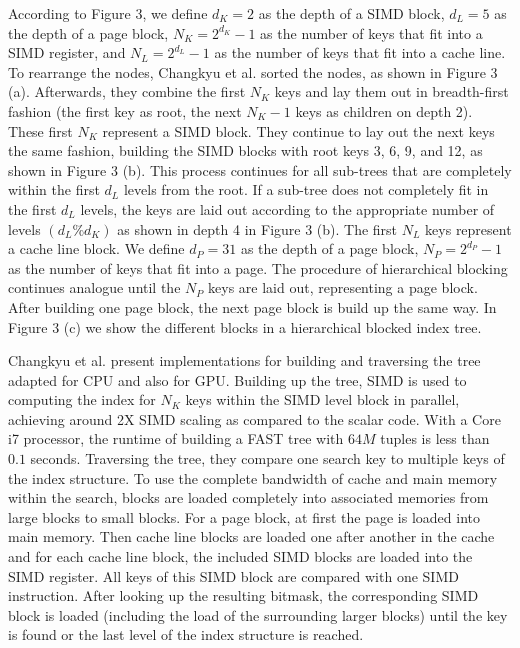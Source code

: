 \documentclass[conference]{IEEEtran}
\begin{document}
According to Figure 3, we define $d_K=2$ as the depth of a SIMD block, $d_L=5$ as the depth of a page block, $N_K=2^{d_K} -1$ as the number of keys that fit into a SIMD register, and $N_L = 2^{d_L} - 1$ as the number of keys that fit into a cache line. To rearrange the nodes, Changkyu et al. sorted the nodes, as shown in Figure 3 (a). Afterwards, they combine the first $N_K$ keys and lay them out in breadth-first fashion (the first key as root, the next $N_K - 1$ keys as children on depth 2). These first $N_K$ represent a SIMD block. They continue to lay out the next keys the same fashion, building the SIMD blocks with root keys 3, 6, 9, and 12, as shown in Figure 3 (b). This process continues for all sub-trees that are completely within the first $d_L$ levels from the root. If a sub-tree does not completely fit in the first $d_L$ levels, the keys are laid out according to the appropriate number of levels $(d_L \% d_K)$ as shown in depth 4 in Figure 3 (b). The first $N_L$ keys represent a cache line block. We define $d_P=31$ as the depth of a page block, $N_P=2^{d_P} -1$ as the number of keys that fit into a page. The procedure of hierarchical blocking continues analogue until the $N_P$ keys are laid out, representing a page block. After building one page block, the next page block is build up the same way. In Figure 3 (c) we show the different blocks in a hierarchical blocked index tree.

Changkyu et al. present implementations for building and traversing the tree adapted for CPU and also for GPU. Building up the tree, SIMD is used to computing the index for $N_K$ keys within the SIMD level block in parallel, achieving around 2X SIMD scaling as compared to the scalar code. With a Core i7 processor, the runtime of building a FAST tree with $64M$ tuples is less than $0.1$ seconds. Traversing the tree, they compare one search key to multiple keys of the index structure. To use the complete bandwidth of cache and main memory within the search, blocks are loaded completely into associated memories from large blocks to small blocks. For a page block, at first the page is loaded into main memory. Then cache line blocks are loaded one after another in the cache and for each cache line block, the included SIMD blocks are loaded into the SIMD register. All keys of this SIMD block are compared with one SIMD instruction. After looking up the resulting bitmask, the corresponding SIMD block is loaded (including the load of the surrounding larger blocks) until the key is found or the last level of the index structure is reached.
\end{document}
